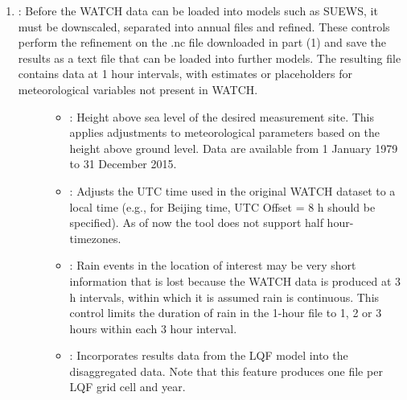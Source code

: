 \documentclass[letterpaper,10pt,english]{sphinxmanual}
\begin{document}
\begin{itemize}
\begin{description}
\begin{itemize}
\begin{description}
\begin{enumerate}
\begin{description}
\end{description}

\item {} \begin{description}
\item[{: Before the WATCH data can be loaded into models such as SUEWS, it must be downscaled, separated into annual files and refined. These controls perform the refinement on the .nc file downloaded in part (1) and save the results as a text file that can be loaded into further models. The resulting file contains data at 1 hour intervals, with estimates or placeholders for meteorological variables not present in WATCH.}] \leavevmode\begin{itemize}
\item {} 
: Height above sea level of the desired measurement site. This applies adjustments to meteorological parameters based on the height above ground level. Data are available from 1 January 1979 to 31 December 2015.

\item {} 
: Adjusts the UTC time used in the original WATCH dataset to a local time (e.g., for Beijing time, UTC Offset = 8 h should be specified).  As of now the tool does not support half hour-timezones.

\item {} 
: Rain events in the location of interest may be very short \textendash{} information that is lost because the WATCH data is produced at 3 h intervals, within which it is assumed rain is continuous. This control limits the duration of rain in the 1-hour file to 1, 2 or 3 hours within each 3 hour interval.

\item {} 
: Incorporates results data from the LQF model into the disaggregated data. Note that this feature produces one file per LQF grid cell and year.

\end{itemize}

\end{description}

\end{enumerate}

\end{description}

\end{itemize}


\end{description}
\end{itemize}
\end{document}
